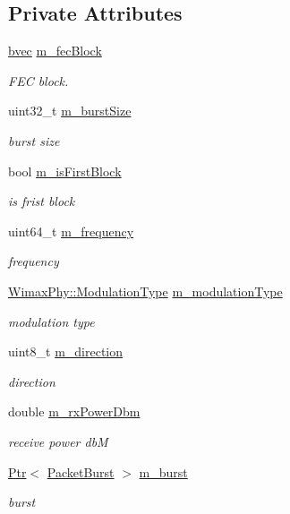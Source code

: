\subsection*{Private Attributes}
\begin{DoxyCompactItemize}
\item 
\hyperlink{namespacens3_a184f2682613716e1a24969b3e70b4242}{bvec} \hyperlink{classns3_1_1simpleOfdmSendParam_a68a3991b6a7497e714c3ec7e6de9c22e}{m\+\_\+fec\+Block}
\begin{DoxyCompactList}\small\item\em F\+EC block. \end{DoxyCompactList}\item 
uint32\+\_\+t \hyperlink{classns3_1_1simpleOfdmSendParam_a4bd571f4ba449db6017ffc9160829590}{m\+\_\+burst\+Size}
\begin{DoxyCompactList}\small\item\em burst size \end{DoxyCompactList}\item 
bool \hyperlink{classns3_1_1simpleOfdmSendParam_aad208accb85175427319a4b583616200}{m\+\_\+is\+First\+Block}
\begin{DoxyCompactList}\small\item\em is frist block \end{DoxyCompactList}\item 
uint64\+\_\+t \hyperlink{classns3_1_1simpleOfdmSendParam_a0053a2916bdd4f0756416c17c61d5455}{m\+\_\+frequency}
\begin{DoxyCompactList}\small\item\em frequency \end{DoxyCompactList}\item 
\hyperlink{classns3_1_1WimaxPhy_a044c5d8a48ca992c39c2a946f6e755fa}{Wimax\+Phy\+::\+Modulation\+Type} \hyperlink{classns3_1_1simpleOfdmSendParam_a58faa9fc1dc97cc244f5095d2ff1e47f}{m\+\_\+modulation\+Type}
\begin{DoxyCompactList}\small\item\em modulation type \end{DoxyCompactList}\item 
uint8\+\_\+t \hyperlink{classns3_1_1simpleOfdmSendParam_a083f2612eb3617fbf1800ec4e10d663a}{m\+\_\+direction}
\begin{DoxyCompactList}\small\item\em direction \end{DoxyCompactList}\item 
double \hyperlink{classns3_1_1simpleOfdmSendParam_aa1ee62a067667955c3392116dcb4a2c2}{m\+\_\+rx\+Power\+Dbm}
\begin{DoxyCompactList}\small\item\em receive power dbM \end{DoxyCompactList}\item 
\hyperlink{classns3_1_1Ptr}{Ptr}$<$ \hyperlink{classns3_1_1PacketBurst}{Packet\+Burst} $>$ \hyperlink{classns3_1_1simpleOfdmSendParam_a06e47da1dcf69efd79f9a36e54f59ea3}{m\+\_\+burst}
\begin{DoxyCompactList}\small\item\em burst \end{DoxyCompactList}\end{DoxyCompactItemize}


